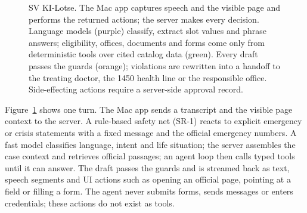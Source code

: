 \documentclass[10pt]{article}
\makeatletter
\renewcommand\paragraph{\@startsection{paragraph}{4}{\z@}{0.35em}{-0.8em}{\normalfont\normalsize\bfseries}}
\newcommand{\legendchip}[2]{\tikz[baseline=-0.6ex]\node[#1, minimum width=0.34cm, minimum height=0.22cm, inner sep=0pt, rounded corners=1pt]{};\,{\sffamily\scriptsize #2}}
\makeatother
\begin{document}
\begin{figure}[t]
\caption{SV KI-Lotse. The Mac app captures speech and the visible page and performs the returned
actions; the server makes every decision. Language models (purple) classify, extract slot values and
phrase answers; eligibility, offices, documents and forms come only from deterministic tools over
cited catalog data (green). Every draft passes the guards (orange); violations are rewritten into a
handoff to the treating doctor, the 1450 health line or the responsible office. Side-effecting
actions require a server-side approval record.}
\label{fig:arch}
\end{figure}

\paragraph{Overview.} Figure~\ref{fig:arch} shows one turn. The Mac app sends a transcript and the
visible page context to the server. A rule-based safety net (SR-1) reacts to explicit emergency or
crisis statements with a fixed message and the official emergency numbers. A fast model classifies
language, intent and life situation; the server assembles the case context and retrieves official
passages; an agent loop then calls typed tools until it can answer. The draft passes the guards and
is streamed back as text, speech segments and UI actions such as opening an official page, pointing
at a field or filling a form. The agent never submits forms, sends messages or enters credentials;
these actions do not exist as tools.
\end{document}
